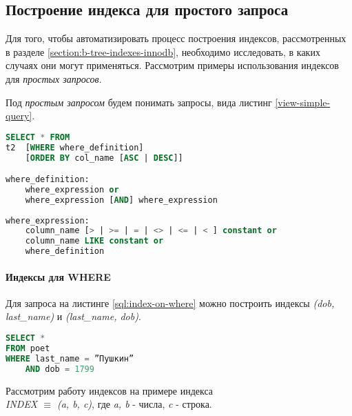 \subsection{Построение индекса для простого запроса}
\label{section:simple-index}

Для того, чтобы автоматизировать процесс построения индексов, рассмотренных в разделе \ref{section:b-tree-indexes-innodb}, необходимо исследовать, в каких случаях они могут применяться. Рассмотрим примеры использования индексов для \textit{простых запросов}.

Под \textit{простым запросом} будем понимать запросы, вида листинг \ref{view-simple-query}.

\begin{lstlisting}[language=sql, caption={Вид простого запроса},label=view-simple-query]
SELECT * FROM
t2  [WHERE where_definition]
    [ORDER BY col_name [ASC | DESC]]

where_definition:
    where_expression or 
    where_expression [AND] where_expression 
    
where_expression:
    column_name [> | >= | = | <> | <= | < ] constant or
    column_name LIKE constant or 
    where_definition   
\end{lstlisting}


\paragraph{Индексы для WHERE}

Для запроса на листинге \ref{sql:index-on-where} можно построить индексы \textit{(dob, last\_name)} и \textit{(last_name, dob)}.
\begin{lstlisting}[language=sql, label=sql:index-on-where, caption={запрос для index-on-where}]
SELECT * 
FROM poet
WHERE last_name = ”Пушкин” 
    AND dob = 1799
\end{lstlisting}

Рассмотрим работу индексов на примере индекса \\
\textit{INDEX $\equiv$ (a, b, c)}, где \textit{a, b} - числа, \textit{c} - строка.

